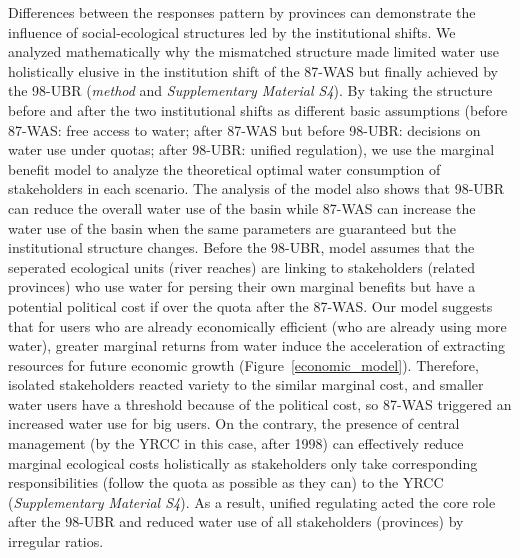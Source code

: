 Differences between the responses pattern by provinces can demonstrate the influence of social-ecological structures led by the institutional shifts.
We analyzed mathematically why the mismatched structure made limited water use holistically elusive in the institution shift of the 87-WAS but finally achieved by the 98-UBR (\textit{method} and \textit{Supplementary Material S4}).
By taking the structure before and after the two institutional shifts as different basic assumptions (before 87-WAS: free access to water; after 87-WAS but before 98-UBR: decisions on water use under quotas; after 98-UBR: unified regulation), we use the marginal benefit model to analyze the theoretical optimal water consumption of stakeholders in each scenario.
The analysis of the model also shows that 98-UBR can reduce the overall water use of the basin while 87-WAS can increase the water use of the basin when the same parameters are guaranteed but the institutional structure changes.
Before the 98-UBR, model assumes that the seperated ecological units (river reaches) are linking to stakeholders (related provinces) who use water for persing their own marginal benefits but have a potential political cost if over the quota after the 87-WAS.
Our model suggests that for users who are already economically efficient (who are already using more water), greater marginal returns from water induce the acceleration of extracting resources for future economic growth (Figure~\ref{economic_model}).
Therefore, isolated stakeholders reacted variety to the similar marginal cost, and smaller water users have a threshold because of the political cost, so 87-WAS triggered an increased water use for big users.
On the contrary, the presence of central management (by the YRCC in this case, after 1998) can effectively reduce marginal ecological costs holistically as stakeholders only take corresponding responsibilities (follow the quota as possible as they can) to the YRCC (\textit{Supplementary Material S4}).
As a result, unified regulating acted the core role after the 98-UBR and reduced water use of all stakeholders (provinces) by irregular ratios.

